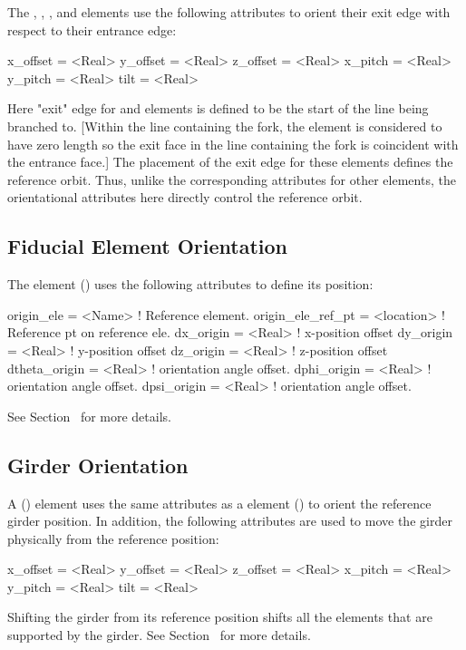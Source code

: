 The , , , and  elements use the following
attributes to orient their exit edge with respect to their entrance edge:
\begin{example}
  x_offset = <Real>
  y_offset = <Real>
  z_offset = <Real>
  x_pitch  = <Real>
  y_pitch  = <Real>
  tilt     = <Real>    
\end{example}
Here "exit" edge for  and  elements is defined to be the start of the line
being branched to. [Within the line containing the fork, the  element is considered to have
zero length so the exit face in the line containing the fork is coincident with the entrance face.]
The placement of the exit edge for these elements defines the reference orbit.  Thus, unlike the
corresponding attributes for other elements, the orientational attributes here directly control the
reference orbit.

\subsection{Fiducial Element Orientation}
\label{s:fiducial.orient}

The  element () uses the 
following attributes to define its position:
\begin{example}
  origin_ele        = <Name>     ! Reference element.
  origin_ele_ref_pt = <location> ! Reference pt on reference ele.
  dx_origin         = <Real>     ! x-position offset
  dy_origin         = <Real>     ! y-position offset
  dz_origin         = <Real>     ! z-position offset
  dtheta_origin     = <Real>     ! orientation angle offset.
  dphi_origin       = <Real>     ! orientation angle offset.
  dpsi_origin       = <Real>     ! orientation angle offset.
\end{example}
See Section~ for more details.

\subsection{Girder Orientation}
\label{s:girder.orient}

A  () element uses the same attributes as a  element
() to orient the reference girder position. In addition, the following attributes
are used to move the girder physically from the reference position:
\begin{example}
  x_offset = <Real>
  y_offset = <Real>
  z_offset = <Real>
  x_pitch  = <Real>
  y_pitch  = <Real>
  tilt     = <Real>    
\end{example}
Shifting the girder from its reference position shifts all the elements that are supported by the
girder. See Section~ for more details.

